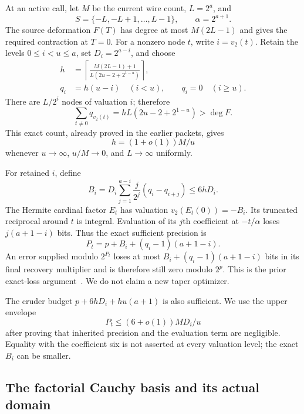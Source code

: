 \documentclass[11pt,letterpaper]{article}
\numberwithin{equation}{section}
\theoremstyle{definition}\newtheorem{definition}[theorem]{Definition}
\theoremstyle{remark}\newtheorem{remark}[theorem]{Remark}
\newcommand{\vTwo}{v_2}
\newcommand{\ceil}[1]{\left\lceil #1\right\rceil}
\begin{document}
At an active call, let $M$ be the current wire count, $L=2^a$, and
\[
 S=\{-L,-L+1,\ldots,L-1\},\qquad \alpha=2^{a+1}.
\]
The source deformation $F(T)$ has degree at most $M(2L-1)$ and gives the required contraction at $T=0$. For a nonzero node $t$, write $i=\vTwo(t)$. Retain the levels $0\le i<u\le a$, set $D_i=2^{a-i}$, and choose
\begin{align}
 h&=\ceil{\frac{M(2L-1)+1}{L(2u-2+2^{1-u})}},\label{eq:h}\\
 q_i&=h(u-i)\quad(i<u),\qquad q_i=0\quad(i\ge u).
\end{align}
There are $L/2^i$ nodes of valuation $i$; therefore
\[
 \sum_{t\ne0}q_{\vTwo(t)}=hL(2u-2+2^{1-u})>\deg F.
\]
This exact count, already proved in the earlier packets, gives
\begin{equation}\label{eq:hslope}
 h=(1+o(1))M/u
\end{equation}
whenever $u\to\infty$, $u/M\to0$, and $L\to\infty$ uniformly.

For retained $i$, define
\begin{equation}\label{eq:Bi}
 B_i=D_i\sum_{j=1}^{a-i}\frac{j}{2^j}(q_i-q_{i+j})\le6hD_i.
\end{equation}
The Hermite cardinal factor $E_t$ has valuation $\vTwo(E_t(0))=-B_i$. Its truncated reciprocal around $t$ is integral. Evaluation of its $j$th coefficient at $-t/\alpha$ loses $j(a+1-i)$ bits. Thus the exact sufficient precision is
\begin{equation}\label{eq:precision}
 P_t=p+B_i+(q_i-1)(a+1-i).
\end{equation}
An error supplied modulo $2^{P_t}$ loses at most $B_i+(q_i-1)(a+1-i)$ bits in its final recovery multiplier and is therefore still zero modulo $2^p$. This is the prior exact-loss argument~\cite{precisionpacket,ethdensity}. We do not claim a new taper optimizer.

The cruder budget $p+6hD_i+hu(a+1)$ is also sufficient. We use the upper envelope
\begin{equation}\label{eq:six}
 P_t\le(6+o(1))MD_i/u
\end{equation}
after proving that inherited precision and the evaluation term are negligible. Equality with the coefficient six is not asserted at every valuation level; the exact $B_i$ can be smaller.

\subsection{The factorial Cauchy basis and its actual domain}
\end{document}
